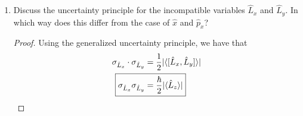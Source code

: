 \documentclass[../psets.tex]{subfiles}
\begin{document}
\begin{enumerate}
\begin{enumerate}
        \begin{proof}
            We have that
            \begin{align*}
                \ev{\hat{L}_x}{n\ell m} &= \ev{\frac{1}{2}(\hat{L}_++\hat{L}_-)}{n\ell m}\\
                \Aboxed{\ev{\hat{L}_x}{n\ell m} &= 0}
            \end{align*}
            Similarly,
            \begin{equation*}
                \boxed{\ev{\hat{L}_y}{n\ell m} = 0}
            \end{equation*}
            Additionally, we have that
            \begin{equation*}
                \ev{(\hat{L}_x^2+\hat{L}_y^2)}{n\ell m} = \ev{(\hat{\vec{L}}{\,}^2-\hat{L}_z^2)}{n\ell m} = \hbar^2[\ell(\ell+1)-m^2]
            \end{equation*}
            Since the above eigenvalue must be greater than or equal to zero, $|m|\leq\ell$.
            Recall that $\hat{L}_x,\hat{L}_y$ are incompatible with $\hat{L}_z$.
            This is why we have an uncertainty associated with the quantity $\hbar^2[\ell(\ell+1)-m^2]$.
            This is also why we have
            \begin{equation*}
                \ev{(\hat{L}_x^2+\hat{L}_y^2)}{n\ell m} = 2\ev{\hat{L}_x^2}{n\ell m}
                = 2\ev{\hat{L}_y^2}{n\ell m}
            \end{equation*}
            so
            \begin{equation*}
                \boxed{\ev{\hat{L}_x^2}{n\ell m} = \ev{\hat{L}_y^2}{n\ell m}
                = \frac{\hbar^2}{2}[\ell(\ell+1)-m^2]}
            \end{equation*}
        \end{proof}
        \pagebreak
        \item Discuss the uncertainty principle for the incompatible variables $\hat{L}_x$ and $\hat{L}_y$. In which way does this differ from the case of $\hat{x}$ and $\hat{p}_x$?
        \begin{proof}
            Using the generalized uncertainty principle, we have that
            \begin{align*}
                \sigma_{\hat{L}_x}\cdot\sigma_{\hat{L}_y} &= \frac{1}{2}|\Exp{[\hat{L}_x,\hat{L}_y]}|\\
                \Aboxed{\sigma_{\hat{L}_x}\sigma_{\hat{L}_y} &= \frac{\hbar}{2}|\Exp{\hat{L}_z}|}
            \end{align*}

\end{proof}
\end{enumerate}
\end{enumerate}
\end{document}
